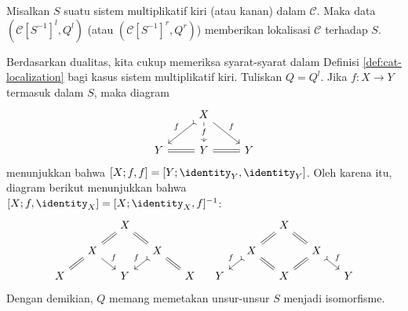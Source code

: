 \begin{teorema}\label{prop:Gabriel-Zisman}
	Misalkan $S$ suatu sistem multiplikatif kiri (atau kanan) dalam
	$\mathcal{C}$. Maka data $\left(\mathcal{C}[S^{-1}]^l,Q^l\right)$
	(atau $\left(\mathcal{C}[S^{-1}]^r,Q^r\right)$) memberikan lokalisasi
	$\mathcal{C}$ terhadap $S$.
\end{teorema}
\begin{bukti}
	Berdasarkan dualitas, kita cukup memeriksa syarat-syarat dalam Definisi
	\ref{def:cat-localization} bagi kasus sistem multiplikatif kiri. Tuliskan
	$Q=Q^l$. Jika $f:X\to Y$ termasuk dalam $S$, maka diagram
	\[ \begin{tikzcd}
		& X \arrow[rightarrowtail, ld, "f"'] \arrow[rd, "f"] \arrow[d, "f" description] & \\
		Y & Y \arrow[equal, l] \arrow[equal, r] & Y
	\end{tikzcd}\]
	menunjukkan bahwa
	$[X;f,f]=[Y;\identity_Y,\identity_Y]$. Oleh karena itu, diagram berikut
	menunjukkan bahwa
	$[X;f,\identity_X]=[X;\identity_X,f]^{-1}$:
	\[\begin{tikzcd}[column sep=small, row sep=small]
		& & X \arrow[equal, ld] \arrow[equal, rd] & & \\
		& X \arrow[equal, ld] \arrow[rd, "f"] & & X \arrow[rightarrowtail, ld, "f"'] \arrow[equal, rd] & \\
		X & & Y & & X
	\end{tikzcd} \quad 
	\begin{tikzcd}[column sep=small, row sep=small]
		& & X \arrow[equal, ld] \arrow[equal, rd] & & \\
		& X \arrow[rightarrowtail, ld, "f"'] \arrow[equal, rd] & & X \arrow[equal, ld] \arrow[rightarrowtail, rd, "f"] & \\
		Y & & X & & Y
	\end{tikzcd}\]
	Dengan demikian, $Q$ memang memetakan unsur-unsur $S$ menjadi isomorfisme.


\end{bukti}

